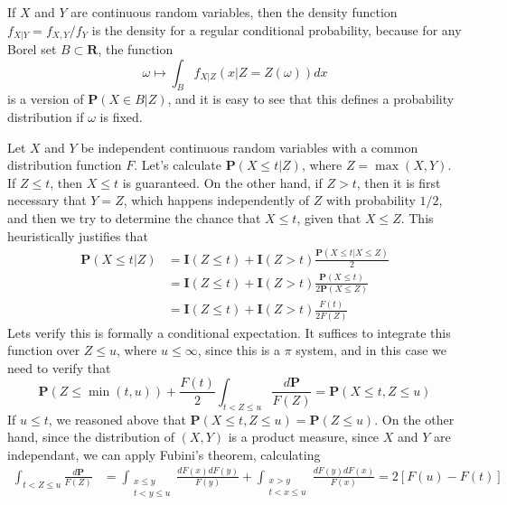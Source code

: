 \begin{example}
    If $X$ and $Y$ are continuous random variables, then the density function $f_{X|Y} = f_{X,Y}/f_Y$ is the density for a regular conditional probability, because for any Borel set $B \subset \mathbf{R}$, the function
    \[ \omega \mapsto \int_B f_{X|Z}(x|Z = Z(\omega)) dx \]
    is a version of $\mathbf{P}(X \in B|Z)$, and it is easy to see that this defines a probability distribution if $\omega$ is fixed.
\end{example}

\begin{example}
    Let $X$ and $Y$ be independent continuous random variables with a common distribution function $F$. Let's calculate $\mathbf{P}(X \leq t | Z)$, where $Z = \max(X,Y)$. If $Z \leq t$, then $X \leq t$ is guaranteed. On the other hand, if $Z > t$, then it is first necessary that $Y = Z$, which happens independently of $Z$ with probability $1/2$, and then we try to determine the chance that $X \leq t$, given that $X \leq Z$. This heuristically justifies that
    \begin{align*}
        \mathbf{P}(X \leq t | Z) &= \mathbf{I}(Z \leq t) + \mathbf{I}(Z > t) \frac{\mathbf{P}(X \leq t | X \leq Z)}{2} \\
        &= \mathbf{I}(Z \leq t) + \mathbf{I}(Z > t) \frac{\mathbf{P}(X \leq t)}{2 \mathbf{P}(X \leq Z)}\\
        &= \mathbf{I}(Z \leq t) + \mathbf{I}(Z > t) \frac{F(t)}{2 F(Z)}
    \end{align*}
    Lets verify this is formally a conditional expectation. It suffices to integrate this function over $Z \leq u$, where $u \leq \infty$, since this is a $\pi$ system, and in this case we need to verify that
    \[ \mathbf{P}(Z \leq \min(t,u)) + \frac{F(t)}{2} \int_{t < Z \leq u} \frac{d\mathbf{P}}{F(Z)} = \mathbf{P}(X \leq t, Z \leq u) \]
    If $u \leq t$, we reasoned above that $\mathbf{P}(X \leq t, Z \leq u) = \mathbf{P}(Z \leq u)$. On the other hand, since the distribution of $(X,Y)$ is a product measure, since $X$ and $Y$ are independant, we can apply Fubini's theorem, calculating
    \begin{align*}
        \int_{t < Z \leq u} \frac{d\mathbf{P}}{F(Z)} &= \int_{\substack{x \leq y\\t < y \leq u}} \frac{dF(x) dF(y)}{F(y)} + \int_{\substack{x > y\\t < x \leq u}} \frac{dF(y) dF(x)}{F(x)}= 2[F(u) - F(t)]
    \end{align*}

\end{example}
